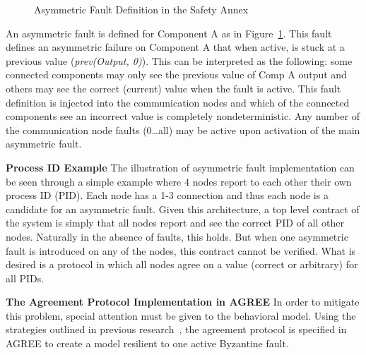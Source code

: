 \begin{figure}[!htb]
        \caption{\label{fig:asymFaultDef} Asymmetric Fault Definition in the Safety Annex}
\end{figure}

An asymmetric fault is defined for Component A as in Figure~\ref{fig:asymFaultDef}. This fault defines an asymmetric failure on Component A that when active, is stuck at a previous value (\textit{prev(Output, 0)}). This can be interpreted as the following: some connected components may only see the previous value of Comp A output and others may see the correct (current) value when the fault is active. This fault definition is injected into the communication nodes and which of the connected components see an incorrect value is completely nondeterministic. Any number of the communication node faults (0…all) may be active upon activation of the main asymmetric fault.

\textbf{Process ID Example}
The illustration of asymmetric fault implementation can be seen through a simple example where 4 nodes report to each other their own process ID (PID). Each node has a 1-3 connection and thus each node is a candidate for an asymmetric fault. Given this architecture, a top level contract of the system is simply that all nodes report and see the correct PID of all other nodes. Naturally in the absence of faults, this holds. But when one asymmetric fault is introduced on any of the nodes, this contract cannot be verified. What is desired is a protocol in which all nodes agree on a value (correct or arbitrary) for all PIDs. 

\textbf{The Agreement Protocol Implementation in AGREE}
In order to mitigate this problem, special attention must be given to the behavioral model. Using the strategies outlined in previous research~\cite{bracha1987asynchronous,Driscoll-Byzantine-Fault}, the agreement protocol is specified in AGREE to create a model resilient to one active Byzantine fault. 

